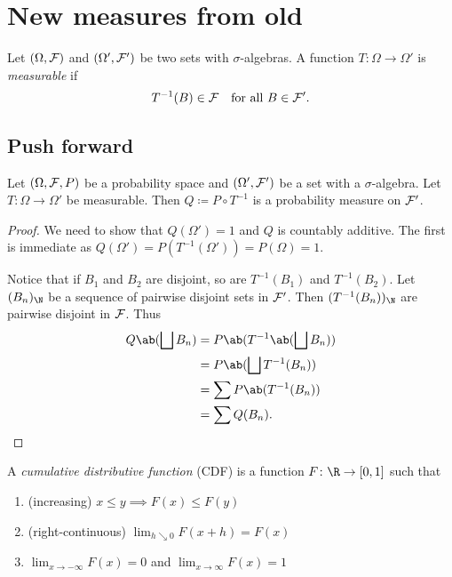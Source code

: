 
\section{New measures from old} \label{sec:new-from-old}
\begin{definition*}
    Let $(\Omega, \mathcal F)$ and $(\Omega', \mathcal F')$ be two sets with
    $\sigma$-algebras.
    A function $T\colon \Omega \to \Omega'$ is \emph{measurable}
    if \[
        T^{-1}(B) \in \mathcal F \quad \text{for all } B \in \mathcal F'.
    \]
\end{definition*}

\subsection{Push forward} \label{sec:push-forward}
\begin{lemma*}
    Let $(\Omega, \mathcal F, P)$ be a probability space and
    $(\Omega', \mathcal F')$ be a set with a $\sigma$-algebra.
    Let $T\colon \Omega \to \Omega'$ be measurable.
    Then $Q \coloneq P \circ T^{-1}$ is a probability measure on
    $\mathcal F'$.
\end{lemma*}
\begin{proof}
    We need to show that $Q(\Omega') = 1$ and $Q$ is countably additive.
    The first is immediate as
    $Q(\Omega') = P(T^{-1}(\Omega')) = P(\Omega) = 1$.

    Notice that if $B_1$ and $B_2$ are disjoint,
    so are $T^{-1}(B_1)$ and $T^{-1}(B_2)$.
    Let $(B_n)_\N$ be a sequence of pairwise disjoint sets in $\mathcal F'$.
    Then $(T^{-1}(B_n))_\N$ are pairwise disjoint in $\mathcal F$.
    Thus \begin{align*}
        Q\ab(\bigsqcup B_n) &= P\ab(T^{-1}\ab(\bigsqcup B_n)) \\
        &= P\ab(\bigsqcup T^{-1}(B_n)) \\
        &= \sum P\ab(T^{-1}(B_n)) \\
        &= \sum Q(B_n). \qedhere
    \end{align*}
\end{proof}

\begin{definition*} \label{def:cdf}
    A \emph{cumulative distributive function} (CDF) is a function
    $F\colon \R \to [0, 1]$ such that
    \begin{enumerate}
        \item (increasing) $x \le y \implies F(x) \le F(y)$
        \item (right-continuous) $\lim_{h \searrow 0} F(x + h) = F(x)$
        \item $\lim_{x \to -\infty} F(x) = 0$ and
            $\lim_{x \to \infty} F(x) = 1$
    \end{enumerate}
\end{definition*}
